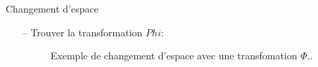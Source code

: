 \documentclass[9pt]{beamer}
\begin{document}
	\begin{frame}{Changement d'espace}
		\begin{itemize}
			\item[--] Trouver la transformation $Phi$:
			\begin{figure}[H]
				{
					\caption{\label{fig::kernel_poly}  Exemple de changement d'espace avec une transfomation $\Phi$..}
				}
			\end{figure}
		\end{itemize}
	\end{frame}
\end{document}
